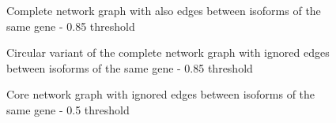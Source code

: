 \documentclass[journal]{IEEEtran}
\begin{document}
\begin{figure}[!ht]
    \centering
    \caption{Complete network graph with also edges between isoforms of the same gene - 0.85 threshold}\label{fig:comp_graph_not_ignored}
\end{figure}

\begin{figure}[!ht]
    \centering
    \caption{Circular variant of the complete network graph with ignored edges between isoforms of the same gene - 0.85 threshold}\label{fig:circ_graph_ignored}
\end{figure}

\begin{figure}[!ht]
    \centering
    \caption{Core network graph with ignored edges between isoforms of the same gene - 0.5 threshold}\label{fig:comp_graph_ignored_0_5}
\end{figure}
\end{document}
